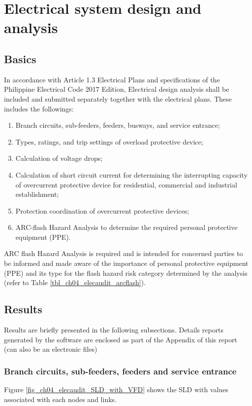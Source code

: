 \section{Electrical system design and analysis} \label{ch04_elecaudit_systemdesign}
\subsection{Basics}
In accordance with Article 1.3 Electrical Plans and specifications of the Philippine Electrical Code 2017 Edition, Electrical design analysis shall be included and submitted separately together with the electrical plans. These includes the followings:

\begin{enumerate}%
\item Branch circuits, sub-feeders, feeders, busways, and service entrance;
\item Types, ratings, and trip settings of overload protective device;
\item Calculation of voltage drops;
\item	Calculation of short circuit current for determining the interrupting capacity of overcurrent protective device for residential, commercial and industrial establishment;
\item	Protection coordination of overcurrent protective devices;
\item	ARC-flash Hazard Analysis to determine the required personal protective equipment (PPE).
\end{enumerate}

ARC flash Hazard Analysis is required and is intended for concerned parties to be informed and made aware of the importance of personal protective equipment (PPE) and its type for the flash hazard risk category determined by the analysis (refer to Table \ref{tbl_ch04_elecaudit_arcflash}).




\subsection{Results}
Results are briefly presented in the following subsections. Details reports generated by the software are enclosed as part of the Appendix of this report (can also be an electronic files)

\subsubsection{Branch circuits, sub-feeders, feeders and service entrance}
Figure \ref{fig_ch04_elecaudit_SLD_with_VFD} shows the SLD with values associated with each nodes and links.

